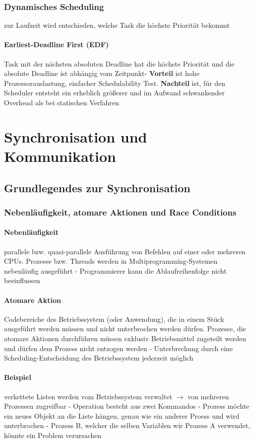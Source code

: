 \documentclass[10pt,a4paper,landscape]{article}
\begin{document}
\begin{multicols*}{3}
	\subsubsection{Dynamisches Scheduling}
	zur Laufzeit wird entschieden, welche Task die höchste Priorität bekommt
	\paragraph{Earliest-Deadline First (EDF)} Task mit der nächsten absoluten Deadline hat die höchste Priorität und die absolute Deadline ist abhängig vom Zeitpunkt- \textbf{Vorteil} ist hohe Prozessorauslastung, einfacher Schedulability Test. \textbf{Nachteil} ist, für den Scheduler entsteht ein erheblich größerer und im Aufwand schwankender Overhead als bei statischen Verfahren
	\section{Synchronisation und Kommunikation}
	\subsection{Grundlegendes zur Synchronisation}
	\subsubsection{Nebenläufigkeit, atomare Aktionen und Race Conditions}
	\paragraph{Nebenläufigkeit} parallele bzw. quasi-parallele Ausführung von Befehlen auf einer oder mehreren CPUs. Prozesse bzw. Threads werden in Multiprogramming-Systemen nebenläufig ausgeführt - Programmierer kann die Ablaufreihenfolge nicht beeinflussen
	\paragraph{Atomare Aktion} Codebereiche des Betriebssystem (oder Anwendung), die in einem Stück ausgeführt werden müssen und nicht unterbrochen werden dürfen. Prozesse, die atomare Aktionen durchführen müssen exklusiv Betriebsmittel zugeteilt werden und dürfen dem Prozess nicht entzogen werden - Unterbrechung durch eine Scheduling-Entscheidung des Betriebssystem jederzeit möglich
	\paragraph{Beispiel} verkettete Listen werden vom Betriebssystem verwaltet $\rightarrow$ von mehreren Prozessen zugreifbar - Operation besteht aus zwei Kommandos - Prozess möchte ein neues Objekt an die Liste hängen, genau wie ein anderer Proess und wird unterbrochen - Prozess B, welcher die selben Variablen wir Prozess  A verwendet, könnte ein Problem verursachen

\end{multicols*}
\end{document}
